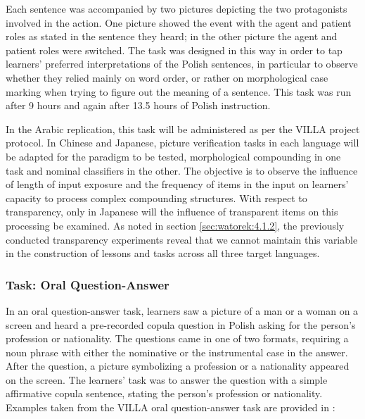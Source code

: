 \documentclass[output=paper,colorlinks,citecolor=brown,modfonts,nonflat]{../langscibook}
\begin{document}
Each sentence was accompanied by two pictures depicting the two protagonists involved in the action. One picture showed the event with the agent and patient roles as stated in the sentence they heard; in the other picture the agent and patient roles were switched. The task was designed in this way in order to tap learners’ preferred interpretations of the Polish sentences, in particular to observe whether they relied mainly on word order, or rather on morphological case marking when trying to figure out the meaning of a sentence. This task was run after 9 hours and again after 13.5 hours of Polish instruction.

In the Arabic replication, this task will be administered as per the VILLA project protocol. In Chinese and Japanese, picture verification tasks in each language will be adapted for the paradigm to be tested, morphological compounding in one task and nominal classifiers in the other. The objective is to observe the influence of length of input exposure and the frequency of items in the input on learners’ capacity to process complex compounding structures. With respect to transparency, only in Japanese will the influence of transparent items on this processing be examined. As noted in section \ref{sec:watorek:4.1.2}, the previously conducted transparency experiments reveal that we cannot maintain this variable in the construction of lessons and tasks across all three target languages.

\subsubsection{Task: Oral Question-Answer}

In an oral question-answer task, learners saw a picture of a man or a woman on a screen and heard a pre-recorded copula question in Polish asking for the person’s profession or nationality. The questions came in one of two formats, requiring a noun phrase with either the nominative or the instrumental case in the answer. After the question, a picture symbolizing a profession or a nationality appeared on the screen. The learners’ task was to answer the question with a simple affirmative copula sentence, stating the person’s profession or nationality. Examples taken from the VILLA oral question-answer task are provided in :

\end{document}
